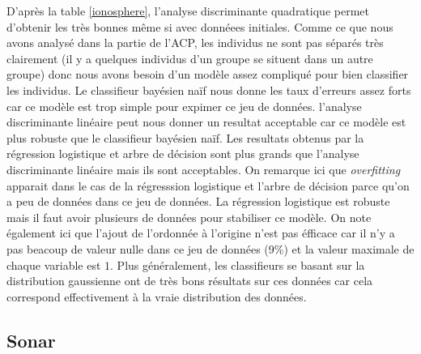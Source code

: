 \documentclass[a4paper,11pt,oneside,roman]{article}
\begin{document}
\newline
D'après la table \ref{ionosphere}, l'analyse discriminante quadratique permet d'obtenir les très bonnes même si avec donnéees initiales. Comme ce que nous avons analysé dans la partie de l'ACP, les individus ne sont pas séparés très clairement (il y a quelques individus d'un groupe se situent dans un autre groupe) donc nous avons besoin d'un modèle assez compliqué pour bien classifier les individus. Le classifieur bayésien naïf nous donne les taux d'erreurs assez forts car ce modèle est trop simple pour expimer ce jeu de données. l'analyse discriminante linéaire peut nous donner un resultat acceptable car ce modèle est plus robuste que le classifieur bayésien naïf. Les resultats obtenus par la régression logistique et arbre de décision sont plus grands que l'analyse discriminante linéaire mais ils sont acceptables. On remarque ici que \textit{overfitting} apparait dans le cas de la régresssion logistique et l'arbre de décision parce qu'on a peu de données dans ce jeu de données. La régression logistique est robuste mais il faut avoir plusieurs de données pour stabiliser ce modèle. On note également ici que l'ajout de l'ordonnée à l'origine  n'est pas éfficace car il n'y a pas beacoup de valeur nulle dans ce jeu de données (9\%) et la valeur maximale de chaque variable est $1$. Plus généralement, les classifieurs se basant sur la distribution gaussienne ont de très bons résultats sur ces données car cela correspond effectivement à la vraie distribution des données.


\subsection{Sonar}
\end{document}
